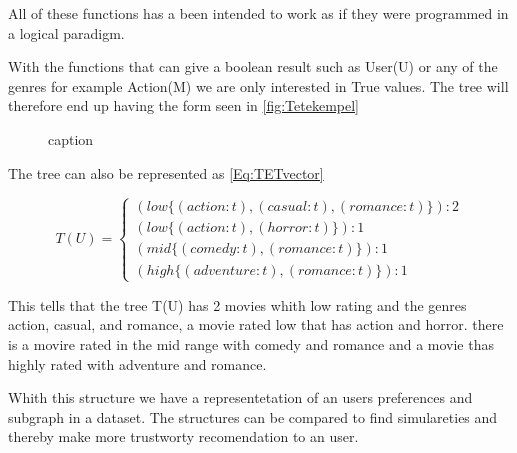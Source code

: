 All of these functions has a been intended to work as if they were programmed in a logical paradigm. 

With the functions that can give a boolean result such as User(U) or any of the genres for example Action(M) we are only interested in True values. The tree will therefore end up having the form seen in \autoref{fig:Tetekempel}

\begin{figure}[H]
    \centering
    \begin{adjustbox}{width=0.5\textwidth}
    
    \end{adjustbox}
    \caption{caption}
    \label{fig:Tetekempel}	
\end{figure}


The tree can also be represented as \autoref{Eq:TETvector}

\begin{equation}\label{Eq:TETvector}
    T(U)=
    \begin{cases}
      (low \{(action:t),(casual:t), (romance:t)\}):2 \\
      (low \{(action:t),(horror:t)\}):1 \\
      (mid \{(comedy:t),(romance:t)\}):1 \\
      (high\{(adventure:t),(romance:t)\}):1
    \end{cases}
\end{equation}

This tells that the tree T(U) has 2 movies whith low rating and the genres action, casual, and romance, a movie rated low that has action and horror. there is a movire rated in the mid range with comedy and romance and a movie thas highly rated with adventure and romance.

Whith this structure we have a representetation of an users preferences and subgraph in a dataset. 
The structures can be compared to find simulareties and thereby make more trustworty recomendation to an user.
